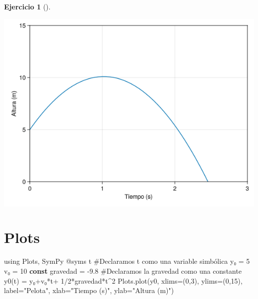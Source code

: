 \documentclass[
  a4paper,
]{scrreport}
\newenvironment{Shaded}{\begin{snugshade}}{\end{snugshade}}
\newcommand{\BuiltInTok}[1]{\textcolor[rgb]{0.00,0.23,0.31}{#1}}
\newcommand{\CommentTok}[1]{\textcolor[rgb]{0.37,0.37,0.37}{#1}}
\newcommand{\FloatTok}[1]{\textcolor[rgb]{0.68,0.00,0.00}{#1}}
\newcommand{\FunctionTok}[1]{\textcolor[rgb]{0.28,0.35,0.67}{#1}}
\newcommand{\ImportTok}[1]{\textcolor[rgb]{0.00,0.46,0.62}{#1}}
\newcommand{\KeywordTok}[1]{\textcolor[rgb]{0.00,0.23,0.31}{\textbf{#1}}}
\newcommand{\NormalTok}[1]{\textcolor[rgb]{0.00,0.23,0.31}{#1}}
\newcommand{\OperatorTok}[1]{\textcolor[rgb]{0.37,0.37,0.37}{#1}}
\newcommand{\PreprocessorTok}[1]{\textcolor[rgb]{0.68,0.00,0.00}{#1}}
\newcommand{\StringTok}[1]{\textcolor[rgb]{0.13,0.47,0.30}{#1}}
\theoremstyle{definition}
\newtheorem{exercise}{Ejercicio}[chapter]
\theoremstyle{remark}
\begin{document}
\begin{exercise}[]
\begin{enumerate}
\begin{tcolorbox}
  \includegraphics{03-funciones-elementales_files/figure-pdf/cell-7-output-1.png}

  \section{Plots}

\begin{Shaded}
\begin{Highlighting}[]
\ImportTok{using} \BuiltInTok{Plots}\NormalTok{, }\BuiltInTok{SymPy}
\PreprocessorTok{@syms}\NormalTok{ t  }\CommentTok{\#Declaramos t como una variable simbólica}
\NormalTok{y₀ }\OperatorTok{=} \FloatTok{5}
\NormalTok{v₀ }\OperatorTok{=} \FloatTok{10}
\KeywordTok{const}\NormalTok{ gravedad }\OperatorTok{=} \OperatorTok{{-}}\FloatTok{9.8}  \CommentTok{\#Declaramos la gravedad como una constante}
\FunctionTok{y0}\NormalTok{(t) }\OperatorTok{=}\NormalTok{ y₀}\OperatorTok{+}\NormalTok{v₀}\OperatorTok{*}\NormalTok{t}\OperatorTok{+} \FloatTok{1}\OperatorTok{/}\FloatTok{2}\OperatorTok{*}\NormalTok{gravedad}\OperatorTok{*}\NormalTok{t}\OperatorTok{\^{}}\FloatTok{2}
\NormalTok{Plots.}\FunctionTok{plot}\NormalTok{(y0, xlims}\OperatorTok{=}\NormalTok{(}\FloatTok{0}\NormalTok{,}\FloatTok{3}\NormalTok{), ylims}\OperatorTok{=}\NormalTok{(}\FloatTok{0}\NormalTok{,}\FloatTok{15}\NormalTok{), label}\OperatorTok{=}\StringTok{"Pelota"}\NormalTok{, xlab}\OperatorTok{=}\StringTok{"Tiempo (s)"}\NormalTok{, ylab}\OperatorTok{=}\StringTok{"Altura (m)"}\NormalTok{)}
\end{Highlighting}
\end{Shaded}


\end{tcolorbox}
\end{enumerate}
\end{exercise}
\end{document}
